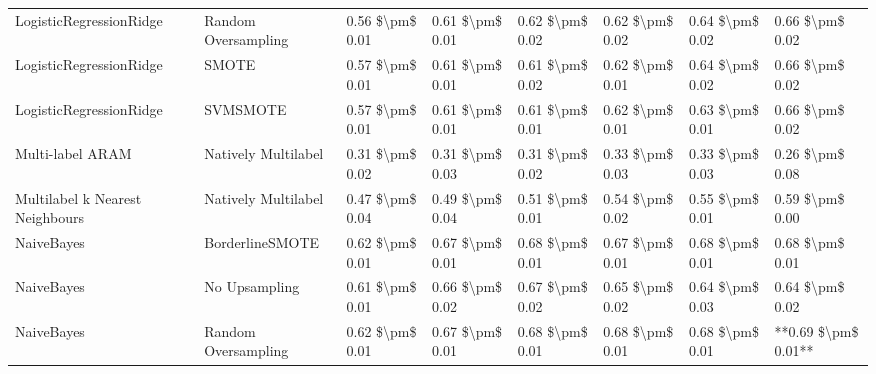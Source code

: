 \begin{tabular}{llllllll}
        LogisticRegressionRidge &           Random Oversampling & 0.56 \$\textbackslash pm\$ 0.01 &           0.61 \$\textbackslash pm\$ 0.01 &       0.62 \$\textbackslash pm\$ 0.02 &        0.62 \$\textbackslash pm\$ 0.02 &                         0.64 \$\textbackslash pm\$ 0.02 &     0.66 \$\textbackslash pm\$ 0.02 \\
        LogisticRegressionRidge &                         SMOTE & 0.57 \$\textbackslash pm\$ 0.01 &           0.61 \$\textbackslash pm\$ 0.01 &       0.61 \$\textbackslash pm\$ 0.02 &        0.62 \$\textbackslash pm\$ 0.01 &                         0.64 \$\textbackslash pm\$ 0.02 &     0.66 \$\textbackslash pm\$ 0.02 \\
        LogisticRegressionRidge &                      SVMSMOTE & 0.57 \$\textbackslash pm\$ 0.01 &           0.61 \$\textbackslash pm\$ 0.01 &       0.61 \$\textbackslash pm\$ 0.01 &        0.62 \$\textbackslash pm\$ 0.01 &                         0.63 \$\textbackslash pm\$ 0.01 &     0.66 \$\textbackslash pm\$ 0.02 \\
               Multi-label ARAM &           Natively Multilabel & 0.31 \$\textbackslash pm\$ 0.02 &           0.31 \$\textbackslash pm\$ 0.03 &       0.31 \$\textbackslash pm\$ 0.02 &        0.33 \$\textbackslash pm\$ 0.03 &                         0.33 \$\textbackslash pm\$ 0.03 &     0.26 \$\textbackslash pm\$ 0.08 \\
Multilabel k Nearest Neighbours &           Natively Multilabel & 0.47 \$\textbackslash pm\$ 0.04 &           0.49 \$\textbackslash pm\$ 0.04 &       0.51 \$\textbackslash pm\$ 0.01 &        0.54 \$\textbackslash pm\$ 0.02 &                         0.55 \$\textbackslash pm\$ 0.01 &     0.59 \$\textbackslash pm\$ 0.00 \\
                     NaiveBayes &               BorderlineSMOTE & 0.62 \$\textbackslash pm\$ 0.01 &           0.67 \$\textbackslash pm\$ 0.01 &       0.68 \$\textbackslash pm\$ 0.01 &        0.67 \$\textbackslash pm\$ 0.01 &                         0.68 \$\textbackslash pm\$ 0.01 &     0.68 \$\textbackslash pm\$ 0.01 \\
                     NaiveBayes &                 No Upsampling & 0.61 \$\textbackslash pm\$ 0.01 &           0.66 \$\textbackslash pm\$ 0.02 &       0.67 \$\textbackslash pm\$ 0.02 &        0.65 \$\textbackslash pm\$ 0.02 &                         0.64 \$\textbackslash pm\$ 0.03 &     0.64 \$\textbackslash pm\$ 0.02 \\
                     NaiveBayes &           Random Oversampling & 0.62 \$\textbackslash pm\$ 0.01 &           0.67 \$\textbackslash pm\$ 0.01 &       0.68 \$\textbackslash pm\$ 0.01 &        0.68 \$\textbackslash pm\$ 0.01 &                         0.68 \$\textbackslash pm\$ 0.01 & **0.69 \$\textbackslash pm\$ 0.01** \\

\end{tabular}
